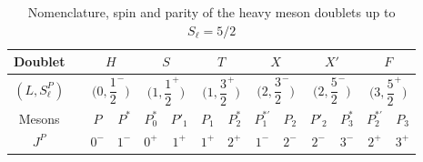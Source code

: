 \begin{table}
  \centering
  \begin{tabular}{c c c c c c c c c c c c c c}
    \toprule
    Doublet & &
      \multicolumn{2}{c}{$H$} & 
      \multicolumn{2}{c}{$S$} & 
      \multicolumn{2}{c}{$T$} & 
      \multicolumn{2}{c}{$X$} & 
      \multicolumn{2}{c}{$X'$} & 
      \multicolumn{2}{c}{$F$} \\
    \midrule
    \addlinespace
    $\left( L, S_\ell^P \right)$ & &
      \multicolumn{2}{c}{$\Bigg( 0, \left. \dfrac{1}{2} \right.^- \Bigg) $} & 
      \multicolumn{2}{c}{$\Bigg( 1, \left. \dfrac{1}{2} \right.^+ \Bigg) $} & 
      \multicolumn{2}{c}{$\Bigg( 1, \left. \dfrac{3}{2} \right.^+ \Bigg) $} & 
      \multicolumn{2}{c}{$\Bigg( 2, \left. \dfrac{3}{2} \right.^- \Bigg) $} & 
      \multicolumn{2}{c}{$\Bigg( 2, \left. \dfrac{5}{2} \right.^- \Bigg) $} & 
      \multicolumn{2}{c}{$\Bigg(  3, \left. \dfrac{5}{2} \right.^+ \Bigg) $} \\
    \addlinespace
    Mesons & & $P$ & $P^*$ & $P_0^*$ & $P'_1$ & $P_1$ & $P_2^*$ & $P_1^{* \prime}$ & $P_2$ & $P'_2$ & $P_3^*$ & $P_2^{* \prime}$ & $P_3$\\
    $J^P$ & & $0^-$ & $1^-$ & $0^+$ & $1^+$ & $1^+$ & $2^+$ & $1^-$ & $2^-$ & $2^-$ & $3^-$ & $2^+$ & $3^+$ \\
    \bottomrule
  \end{tabular}
  \caption{Nomenclature, spin and parity of the heavy meson doublets up to $S_\ell = 5/2$}
\end{table}

